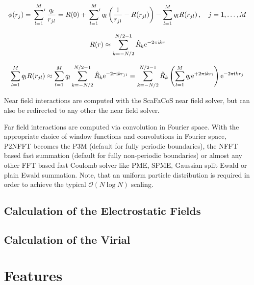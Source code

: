 \begin{equation*}
  \phi(r_j)
  =
  \sideset{}{^\prime}\sum_{l=1}^M
    \frac{q_l}{r_{jl}}
  =
  R(0) + \sideset{}{^\prime}\sum_{l=1}^M
    q_l \left( \frac{1}{r_{jl}} - R(r_{jl}) \right)
  - \sum_{l=1}^M
    q_l R(r_{jl})
  \,,\quad j=1,\hdots,M
\end{equation*}



\begin{equation*}
  R(r)
  \approx
    \sum_{k=-N/2}^{N/2-1} \hat R_k \mbox{\rm{e}}^{-2\pi\mbox{\scriptsize\rm{i}} kr}
\end{equation*}

\begin{equation*}
  \sum_{l=1}^M
    q_l R(r_{jl})
  \approx
  \sum_{l=1}^M q_l
    \sum_{k=-N/2}^{N/2-1} \hat R_k \mbox{\rm{e}}^{-2\pi\mbox{\scriptsize\rm{i}} kr_{jl}}
  =
  \sum_{k=-N/2}^{N/2-1} \hat R_k
    \left(
      \sum_{l=1}^M q_l \mbox{\rm{e}}^{+2\pi\mbox{\scriptsize\rm{i}} kr_l}
    \right)
    \mbox{\rm{e}}^{-2\pi\mbox{\scriptsize\rm{i}} kr_j}
\end{equation*}

Near field interactions are computed with the ScaFaCoS near field solver, but can also be redirected to any other the near field solver.

Far field interactions are computed via convolution in Fourier space.
With the appropriate choice of window functions and convolutions in Fourier space,
P2NFFT becomes the P3M (default for fully periodic boundaries), the NFFT based fast summation (default for fully non-periodic boundaries)
or almost any other FFT based fast Coulomb solver like PME, SPME, Gaussian split Ewald or plain Ewald summation.
Note, that an uniform particle distribution is required in order to achieve the typical $\mathcal{O}(N\log N)$ scaling.

\subsection{Calculation of the Electrostatic Fields}

\subsection{Calculation of the Virial}






\newpage
\section{Features}

